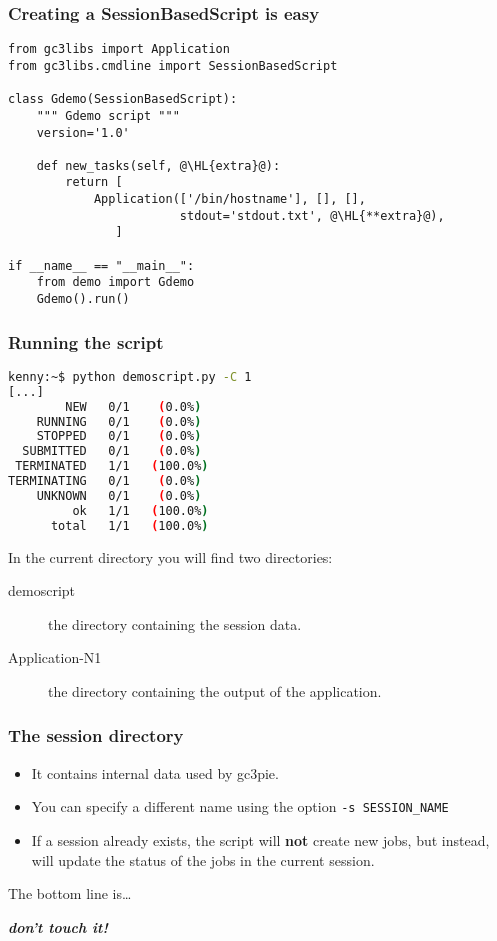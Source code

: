 \documentclass[english,serif,mathserif,xcolor=pdftex,dvipsnames,table]{beamer}
\begin{document}
\begin{frame}[fragile]
  \frametitle{Creating a SessionBasedScript is easy}
  \begin{lstlisting}
from gc3libs import Application
from gc3libs.cmdline import SessionBasedScript

class Gdemo(SessionBasedScript):
    """ Gdemo script """
    version='1.0'

    def new_tasks(self, @\HL{extra}@):
        return [
            Application(['/bin/hostname'], [], [],
                        stdout='stdout.txt', @\HL{**extra}@),
               ]

if __name__ == "__main__":
    from demo import Gdemo
    Gdemo().run()
  \end{lstlisting}
\end{frame}

\begin{frame}[fragile]
  \frametitle{Running the script}

  \begin{lstlisting}[language=sh]
kenny:~$ python demoscript.py -C 1    
[...]
        NEW   0/1    (0.0%)  
    RUNNING   0/1    (0.0%)  
    STOPPED   0/1    (0.0%)  
  SUBMITTED   0/1    (0.0%)  
 TERMINATED   1/1   (100.0%) 
TERMINATING   0/1    (0.0%)  
    UNKNOWN   0/1    (0.0%)  
         ok   1/1   (100.0%) 
      total   1/1   (100.0%) 
  \end{lstlisting}%
  \pause
  \+

  In the current directory you will find two directories:
  \begin{description}
  \item[demoscript] the directory containing the session data.
  \item[Application-N1] the directory containing the output of the
    application.
  \end{description}
\end{frame}

\begin{frame}[fragile]
  \frametitle{The session directory}

  \begin{itemize}
  \item It contains internal data used by gc3pie.
  \item You can specify a different name using the option \lstinline|-s SESSION_NAME|
  \item If a session already exists, the script will \textbf{not} create
    new jobs, but instead, will update the status of the jobs in the
    current session.
  \end{itemize}

  The bottom line is\ldots 

  \pause 
  \begin{center}
    \textit{\textbf{don't touch it!}}
  \end{center}
  
\end{frame}
\end{document}
